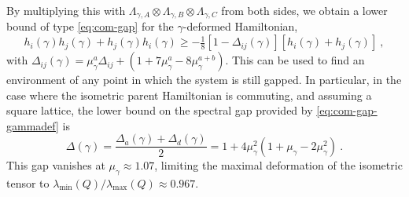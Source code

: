 \documentclass[twocolumn,superscriptaddress,prb,linenumbers]{revtex4-1}
\begin{document}
By multiplying this with $\Lambda_{\gamma,A}\otimes
    \Lambda_{\gamma,B}\otimes \Lambda_{\gamma,C}$ from both sides, we obtain
a lower bound of type \eqref{eq:com-gap} for the $\gamma$-deformed
Hamiltonian,
\begin{equation}
    \label{eq:com-gap-gammadef}
    h_i(\gamma) h_j(\gamma)+ h_j(\gamma) h_i(\gamma)\ge
    -\tfrac18[1-\Delta_{ij}(\gamma)]
    [h_i(\gamma)+h_j(\gamma)]\ ,
\end{equation}
with $\Delta_{ij}(\gamma)=
    \mu^a_\gamma\Delta_{ij}+(1+7\mu^a_\gamma-8\mu^{a+b}_\gamma)$.  This can be
used to find an environment of any point in which the system is
still gapped.  In particular, in the case where the isometric parent
Hamiltonian is commuting, and assuming a square lattice, the lower bound
on the spectral gap provided by \eqref{eq:com-gap-gammadef} is
\[
    \Delta(\gamma)=\frac{\Delta_a(\gamma)+\Delta_d(\gamma)}{2}=
    1+4\mu_\gamma^2(1+\mu_\gamma-2\mu_\gamma^2)\ .
\]
This gap vanishes at $\mu_\gamma\approx 1.07$, limiting the maximal deformation of
the isometric tensor to $\lambda_{\min}(Q)/\lambda_{\max}(Q)\approx0.967$.
\end{document}
